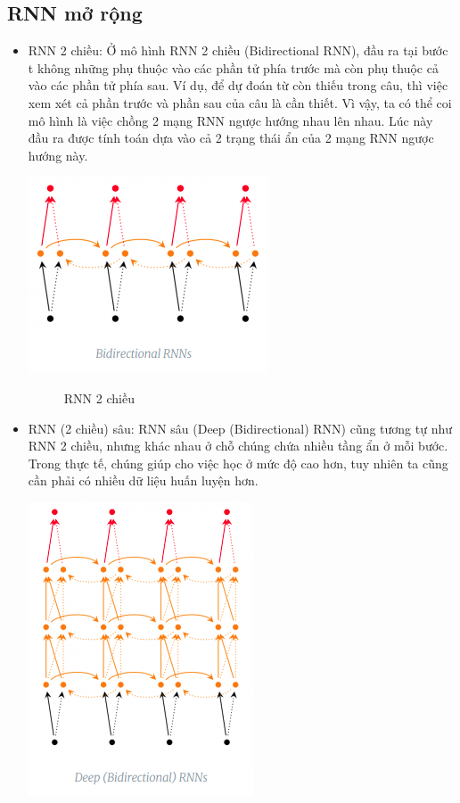 \subsection{RNN mở rộng}
\begin{itemize}
    \item RNN 2 chiều: Ở mô hình RNN 2 chiều (Bidirectional RNN), đầu ra tại bước t không những phụ thuộc vào các phần tử phía trước mà còn phụ thuộc cả vào các phần tử phía sau. Ví dụ, để dự đoán từ còn thiếu trong câu, thì việc xem xét cả phần trước và phần sau của câu là cần thiết. Vì vậy, ta có thể coi mô hình là việc chồng 2 mạng RNN ngược hướng nhau lên nhau. Lúc này đầu ra được tính toán dựa vào cả 2 trạng thái ẩn của 2 mạng RNN ngược hướng này.
    \begin{center}
    \includegraphics[scale=.5]{image/chapter6/RNN-2.png}
    \begin{figure}[htp]
    \begin{center}
     
    \end{center}
    \caption{RNN 2 chiều}
    \end{figure}
    \end{center}
    \item RNN (2 chiều) sâu: RNN sâu (Deep (Bidirectional) RNN) cũng tương tự như RNN 2 chiều, nhưng khác nhau ở chỗ chúng chứa nhiều tầng ẩn ở mỗi bước. Trong thực tế, chúng giúp cho việc học ở mức độ cao hơn, tuy nhiên ta cũng cần phải có nhiều dữ liệu huấn luyện hơn.
    \begin{center}
    \includegraphics[scale=.3]{image/chapter6/RNN-4.png}
    \begin{figure}[htp]
    \begin{center}
     

\end{center}
\end{figure}
\end{center}
\end{itemize}
